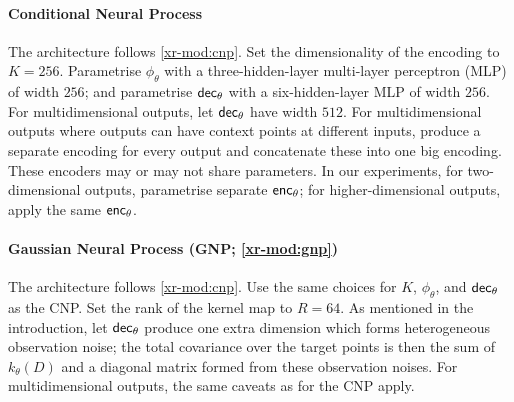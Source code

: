\documentclass[12pt]{report}
\newcommand{\xrprefix}[1]{xr-#1}
\begin{document}
\paragraph{Conditional Neural Process \parencite[CNP;][]{Garnelo:2018:Conditional_Neural_Processes}}
The architecture follows \cref{\xrprefix{mod:cnp}}.
Set the dimensionality of the encoding to $K = 256$.
Parametrise $\phi_\theta$ with a three-hidden-layer multi-layer perceptron (MLP) of width $256$;
and parametrise $\mathsf{dec}_\theta$ with a six-hidden-layer MLP of width $256$.
For multidimensional outputs, let $\mathsf{dec}_\theta$ have width $512$.
For multidimensional outputs where outputs can have context points at different inputs, produce a separate encoding for every output and concatenate these into one big encoding.
These encoders may or may not share parameters.
In our experiments, for two-dimensional outputs, parametrise separate $\mathsf{enc}_\theta$;
for higher-dimensional outputs, apply the same $\mathsf{enc}_\theta$.


\paragraph{Gaussian Neural Process (GNP; \cref{\xrprefix{mod:gnp}})}
The architecture follows \cref{\xrprefix{mod:cnp}}.
Use the same choices for $K$, $\phi_\theta$, and $\mathsf{dec}_\theta$ as the CNP.
Set the rank of the kernel map to $R = 64$.
As mentioned in the introduction, let $\mathsf{dec}_\theta$ produce one extra dimension which forms heterogeneous observation noise;
the total covariance over the target points is then the sum of $k_\theta(D)$ and a diagonal matrix formed from these observation noises.
For multidimensional outputs, the same caveats as for the CNP apply.
\end{document}
